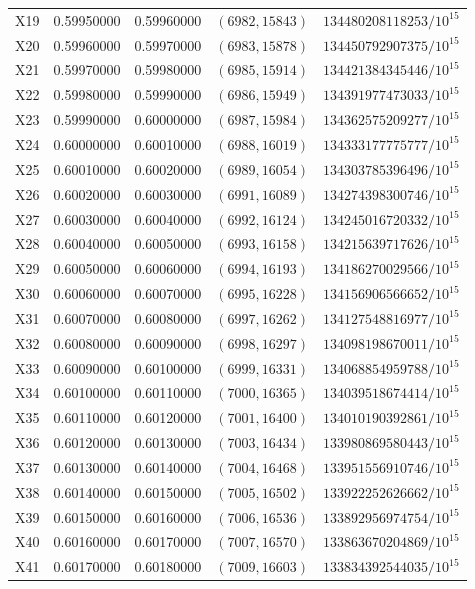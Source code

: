 \documentclass[11pt]{article}
\theoremstyle{remark}\newtheorem{remark}[theorem]{Remark}
\begin{document}
\begin{longtable}{@{}lrrrl@{}}
X19 & 0.59950000 & 0.59960000 & $(6982,15843)$ & $134480208118253/10^{15}$\\
X20 & 0.59960000 & 0.59970000 & $(6983,15878)$ & $134450792907375/10^{15}$\\
X21 & 0.59970000 & 0.59980000 & $(6985,15914)$ & $134421384345446/10^{15}$\\
X22 & 0.59980000 & 0.59990000 & $(6986,15949)$ & $134391977473033/10^{15}$\\
X23 & 0.59990000 & 0.60000000 & $(6987,15984)$ & $134362575209277/10^{15}$\\
X24 & 0.60000000 & 0.60010000 & $(6988,16019)$ & $134333177775777/10^{15}$\\
X25 & 0.60010000 & 0.60020000 & $(6989,16054)$ & $134303785396496/10^{15}$\\
X26 & 0.60020000 & 0.60030000 & $(6991,16089)$ & $134274398300746/10^{15}$\\
X27 & 0.60030000 & 0.60040000 & $(6992,16124)$ & $134245016720332/10^{15}$\\
X28 & 0.60040000 & 0.60050000 & $(6993,16158)$ & $134215639717626/10^{15}$\\
X29 & 0.60050000 & 0.60060000 & $(6994,16193)$ & $134186270029566/10^{15}$\\
X30 & 0.60060000 & 0.60070000 & $(6995,16228)$ & $134156906566652/10^{15}$\\
X31 & 0.60070000 & 0.60080000 & $(6997,16262)$ & $134127548816977/10^{15}$\\
X32 & 0.60080000 & 0.60090000 & $(6998,16297)$ & $134098198670011/10^{15}$\\
X33 & 0.60090000 & 0.60100000 & $(6999,16331)$ & $134068854959788/10^{15}$\\
X34 & 0.60100000 & 0.60110000 & $(7000,16365)$ & $134039518674414/10^{15}$\\
X35 & 0.60110000 & 0.60120000 & $(7001,16400)$ & $134010190392861/10^{15}$\\
X36 & 0.60120000 & 0.60130000 & $(7003,16434)$ & $133980869580443/10^{15}$\\
X37 & 0.60130000 & 0.60140000 & $(7004,16468)$ & $133951556910746/10^{15}$\\
X38 & 0.60140000 & 0.60150000 & $(7005,16502)$ & $133922252626662/10^{15}$\\
X39 & 0.60150000 & 0.60160000 & $(7006,16536)$ & $133892956974754/10^{15}$\\
X40 & 0.60160000 & 0.60170000 & $(7007,16570)$ & $133863670204869/10^{15}$\\
X41 & 0.60170000 & 0.60180000 & $(7009,16603)$ & $133834392544035/10^{15}$\\

\end{longtable}
\end{document}
